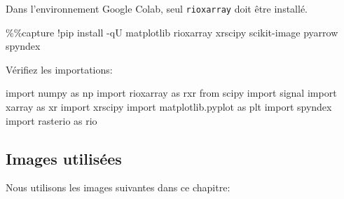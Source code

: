 \documentclass[
  french,
  11pt,
  letterpaper,
  open=any,
  twoside=false,
  french]{scrbook}
\newenvironment{Shaded}{\begin{snugshade}}{\end{snugshade}}
\newcommand{\ImportTok}[1]{\textcolor[rgb]{0.00,0.46,0.62}{#1}}
\newcommand{\NormalTok}[1]{\textcolor[rgb]{0.00,0.23,0.31}{#1}}
\newcommand{\OperatorTok}[1]{\textcolor[rgb]{0.37,0.37,0.37}{#1}}
\begin{document}
Dans l'environnement Google Colab, seul \texttt{rioxarray} doit être
installé.

\begin{Shaded}
\begin{Highlighting}[]
\OperatorTok{\%\%}\NormalTok{capture}
\OperatorTok{!}\NormalTok{pip install }\OperatorTok{{-}}\NormalTok{qU matplotlib rioxarray xrscipy scikit}\OperatorTok{{-}}\NormalTok{image pyarrow spyndex}
\end{Highlighting}
\end{Shaded}

Vérifiez les importations:

\begin{Shaded}
\begin{Highlighting}[]
\ImportTok{import}\NormalTok{ numpy }\ImportTok{as}\NormalTok{ np}
\ImportTok{import}\NormalTok{ rioxarray }\ImportTok{as}\NormalTok{ rxr}
\ImportTok{from}\NormalTok{ scipy }\ImportTok{import}\NormalTok{ signal}
\ImportTok{import}\NormalTok{ xarray }\ImportTok{as}\NormalTok{ xr}
\ImportTok{import}\NormalTok{ xrscipy}
\ImportTok{import}\NormalTok{ matplotlib.pyplot }\ImportTok{as}\NormalTok{ plt}
\ImportTok{import}\NormalTok{ spyndex}
\ImportTok{import}\NormalTok{ rasterio }\ImportTok{as}\NormalTok{ rio}
\end{Highlighting}
\end{Shaded}

\subsection{Images utilisées}\label{images-utilisuxe9es}

Nous utilisons les images suivantes dans ce chapitre:
\end{document}
